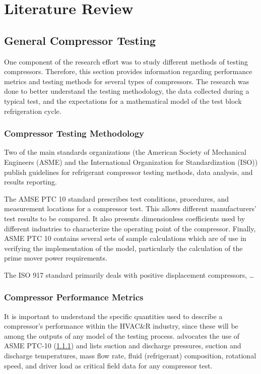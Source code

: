 \chapter{Literature Review} \label{cha:litreview}

\section{General Compressor Testing} \label{sec:gencomp}
One component of the research effort was 
to study different methods of testing compressors. 
Therefore, this section provides information regarding performance metrics 
and testing methods for several types of compressors. 
The research was done to better understand the testing methodology, 
the data collected during a typical test, 
and the expectations for a mathematical model of the test block refrigeration cycle.

\subsection{Compressor Testing Methodology} \label{sec:TestMethodology}
Two of the main standards organizations (the American Society of Mechanical Engineers (ASME) 
and the International Organization for Standardization (ISO)) 
publish guidelines for refrigerant compressor testing methods, data analysis, and results reporting.

The AMSE PTC 10 standard \citep{ptc10} prescribes test conditions, 
procedures, and measurement locations for a compressor test. 
This allows different manufacturers' test results to be compared. 
It also presents dimensionless coefficients used by different industries 
to characterize the operating point of the compressor. 
Finally, ASME PTC 10 contains several sets of sample calculations 
which are of use in verifying the implementation of the model, 
particularly the calculation of the prime mover power requirements.

The ISO 917 
standard primarily deals with positive displacement compressors, \dots \\

\subsection{Compressor Performance Metrics}
It is important to understand the specific quantities used 
to describe a compressor's performance within the HVAC\&R%
industry, since these will be among the outputs of any model of the testing process. 
\citet{wilcox2007} advocates the use of ASME PTC-10 (\cref{sec:TestMethodology}) and lists
  suction and discharge pressures,
  suction and discharge temperatures,
  mass flow rate,
  fluid (refrigerant) composition,
  rotational speed, and
  driver load
as critical field data for any compressor test.

